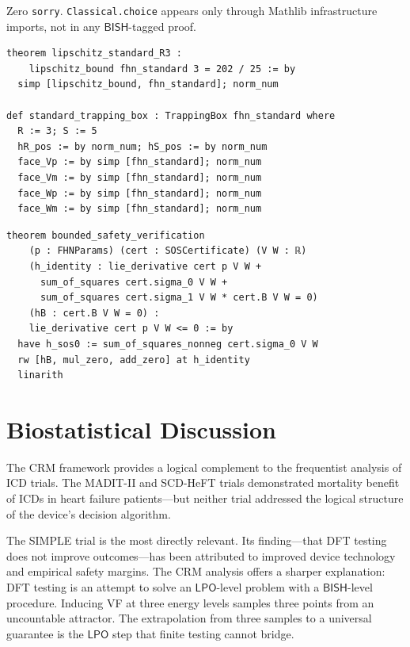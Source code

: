 \documentclass[11pt,a4paper]{article}
\theoremstyle{plain}
\theoremstyle{definition}
\newcommand{\BISH}{\textsf{BISH}}
\newcommand{\LPO}{\textsf{LPO}}
\begin{document}
Zero \texttt{sorry}.  \texttt{Classical.choice} appears only through Mathlib infrastructure imports, not in any $\BISH$-tagged proof.

\begin{tcolorbox}[leanbox={Key verification: Theorem A}]
\begin{lstlisting}
theorem lipschitz_standard_R3 :
    lipschitz_bound fhn_standard 3 = 202 / 25 := by
  simp [lipschitz_bound, fhn_standard]; norm_num

def standard_trapping_box : TrappingBox fhn_standard where
  R := 3; S := 5
  hR_pos := by norm_num; hS_pos := by norm_num
  face_Vp := by simp [fhn_standard]; norm_num
  face_Vm := by simp [fhn_standard]; norm_num
  face_Wp := by simp [fhn_standard]; norm_num
  face_Wm := by simp [fhn_standard]; norm_num
\end{lstlisting}
\end{tcolorbox}

\begin{tcolorbox}[leanbox={Key verification: Theorem B}]
\begin{lstlisting}
theorem bounded_safety_verification
    (p : FHNParams) (cert : SOSCertificate) (V W : ℝ)
    (h_identity : lie_derivative cert p V W +
      sum_of_squares cert.sigma_0 V W +
      sum_of_squares cert.sigma_1 V W * cert.B V W = 0)
    (hB : cert.B V W = 0) :
    lie_derivative cert p V W <= 0 := by
  have h_sos0 := sum_of_squares_nonneg cert.sigma_0 V W
  rw [hB, mul_zero, add_zero] at h_identity
  linarith
\end{lstlisting}
\end{tcolorbox}

\section{Biostatistical Discussion}\label{sec:biostat}

The CRM framework provides a logical complement to the frequentist analysis of ICD trials.  The MADIT-II \cite{madit2} and SCD-HeFT \cite{scdheft} trials demonstrated mortality benefit of ICDs in heart failure patients---but neither trial addressed the logical structure of the device's decision algorithm.

The SIMPLE trial \cite{simple2013} is the most directly relevant.  Its finding---that DFT testing does not improve outcomes---has been attributed to improved device technology and empirical safety margins.  The CRM analysis offers a sharper explanation: DFT testing is an attempt to solve an $\LPO$-level problem with a $\BISH$-level procedure.  Inducing VF at three energy levels samples three points from an uncountable attractor.  The extrapolation from three samples to a universal guarantee is the $\LPO$ step that finite testing cannot bridge.
\end{document}
